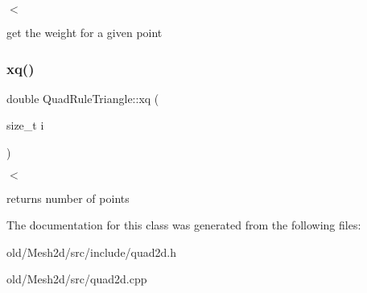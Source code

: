 $<$ 

get the weight for a given point \mbox{\label{classMeshFramework2D_1_1QuadRuleTriangle_a98156eda410a5aa6f9787ce920358fca}} 
\subsubsection{\texorpdfstring{xq()}{xq()}}
{\footnotesize\ttfamily double Quad\+Rule\+Triangle\+::xq (\begin{DoxyParamCaption}\item[{size\+\_\+t}]{i }\end{DoxyParamCaption})}



$<$ 

returns number of points 

The documentation for this class was generated from the following files\+:\begin{DoxyCompactItemize}
\item 
old/\+Mesh2d/src/include/quad2d.\+h\item 
old/\+Mesh2d/src/quad2d.\+cpp\end{DoxyCompactItemize}
